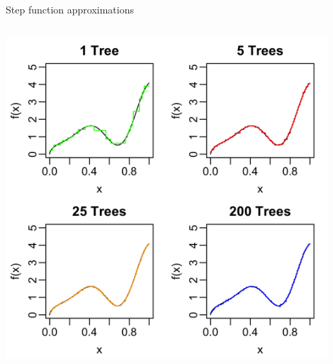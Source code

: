 \documentclass[aspectratio=199]{beamer}
\begin{document}
\begin{frame}{Step function approximations}

\begin{columns}
\centering
\begin{column}{0.3\textwidth}
\centering
\includegraphics[width = 0.9\textwidth]{figures/sum_of_trees_smooth}
\end{column}


\end{columns}
\end{frame}
\end{document}
